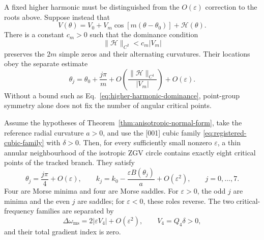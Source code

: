 A fixed higher harmonic must be distinguished from the
\(O(\varepsilon)\) correction to the roots above.  Suppose instead that
\begin{equation}
  V(\theta)=V_0+V_m\cos[m(\theta-\theta_0)]
             +\mathcal H(\theta).
  \label{eq:leading-harmonic-plus-remainder}
\end{equation}
There is a constant \(c_m>0\) such that the dominance condition
\begin{equation}
  \lVert\mathcal H\rVert_{C^2}
  <c_m|V_m|
  \label{eq:higher-harmonic-dominance}
\end{equation}
preserves the \(2m\) simple zeros and their alternating curvatures.  Their
locations obey the separate estimate
\begin{equation}
  \theta_j
  =\theta_0+\frac{j\pi}{m}
   +O\left(
      \frac{\lVert\mathcal H\rVert_{C^1}}{|V_m|}
    \right)
   +O(\varepsilon).
  \label{eq:higher-harmonic-root-shift}
\end{equation}
Without a bound such as Eq.~\eqref{eq:higher-harmonic-dominance}, point-group
symmetry alone does not fix the number of angular critical points.

\begin{theorem}
\label{thm:cubic-morse-splitting}
Assume the hypotheses of Theorem~\ref{thm:anisotropic-normal-form}, take the
reference radial curvature \(a>0\), and use the [001] cubic family
\eqref{eq:registered-cubic-family} with \(\delta>0\).  Then, for every
sufficiently small nonzero \(\varepsilon\), a thin annular neighbourhood of
the isotropic ZGV circle contains exactly eight critical points of the
tracked branch.  They satisfy
\begin{equation}
  \theta_j=\frac{j\pi}{4}+O(\varepsilon),
  \qquad
  k_j=k_0-\frac{\varepsilon B(\theta_j)}{a}
       +O(\varepsilon^2),
  \qquad j=0,\ldots,7.
  \label{eq:cubic-eight-critical-points}
\end{equation}
Four are Morse minima and four are Morse saddles.  For
\(\varepsilon>0\), the odd \(j\) are minima and the even \(j\) are saddles;
for \(\varepsilon<0\), these roles reverse.  The two critical-frequency
families are separated by
\begin{equation}
  \Delta\omega_{\mathrm{ms}}
  =2|\varepsilon V_4|+O(\varepsilon^2),
  \qquad V_4=Q_4\delta>0,
  \label{eq:cubic-minimum-saddle-separation}
\end{equation}
and their total gradient index is zero.
\end{theorem}

